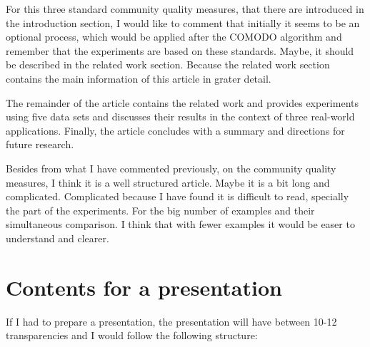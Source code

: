 \documentclass[a4paper]{article}
\begin{document}
For this three standard community quality measures, that there are introduced in the introduction section, I would like to comment that initially it seems to be an optional process, which would be applied after the COMODO algorithm and remember that the experiments are based on these standards. Maybe, it should be described in the related work section. Because the related work section contains the main information of this article in grater detail.

The remainder of the article contains the related work and provides experiments using five data sets and discusses their results in the context of three real-world applications. Finally, the article concludes with a summary and directions for future research.

Besides from what I have commented previously, on the community quality measures, I think it is a well structured article. Maybe it is a bit long and complicated. Complicated because I have found it is difficult to read, specially the part of the experiments. For the big number of examples and their simultaneous comparison. I think that with fewer examples it would be easer to understand and clearer.

\section*{Contents for a presentation}
If I had to prepare a presentation, the presentation will have between 10-12 transparencies and I would follow the following structure:
\end{document}
